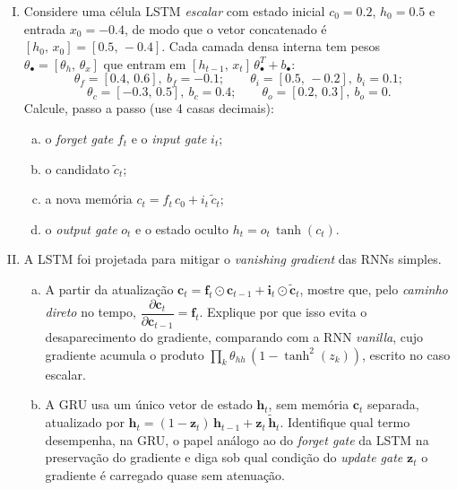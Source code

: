 \documentclass{dlproblemset}
\begin{document}
\begin{enumerate}[I)]

\item Considere uma célula LSTM \emph{escalar} com estado inicial $c_0 = 0.2$,
$h_0 = 0.5$ e entrada $x_0 = -0.4$, de modo que o vetor concatenado é
$[h_0,\, x_0] = [0.5,\, -0.4]$. Cada camada densa interna tem pesos
$\theta_\bullet = [\theta_h,\, \theta_x]$ que entram em $[h_{t-1},\, x_t]\,\theta_\bullet^{T} + b_\bullet$:
\[
    \theta_f = [0.4,\, 0.6],\ b_f = -0.1; \qquad
    \theta_i = [0.5,\, -0.2],\ b_i = 0.1;
\]
\[
    \theta_c = [-0.3,\, 0.5],\ b_c = 0.4; \qquad
    \theta_o = [0.2,\, 0.3],\ b_o = 0.
\]
Calcule, passo a passo (use 4 casas decimais):
\begin{enumerate}[(a)]
    \item o \textit{forget gate} $f_t$ e o \textit{input gate} $i_t$;
    \item o candidato $\tilde{c}_t$;
    \item a nova memória $c_t = f_t\, c_0 + i_t\, \tilde{c}_t$;
    \item o \textit{output gate} $o_t$ e o estado oculto $h_t = o_t\, \tanh(c_t)$.
\end{enumerate}

\item A LSTM foi projetada para mitigar o \textit{vanishing gradient} das RNNs simples.
\begin{enumerate}[(a)]
    \item A partir da atualização $\mathbf{c}_t = \mathbf{f}_t \odot \mathbf{c}_{t-1} + \mathbf{i}_t \odot \tilde{\mathbf{c}}_t$, mostre que,
    pelo \emph{caminho direto} no tempo, $\dfrac{\partial \mathbf{c}_t}{\partial \mathbf{c}_{t-1}} = \mathbf{f}_t$.
    Explique por que isso evita o desaparecimento do gradiente, comparando com a RNN
    \textit{vanilla}, cujo gradiente acumula o produto
    $\prod_k \theta_{hh}\,(1 - \tanh^2(z_k))$, escrito no caso escalar.
    \item {} A GRU usa um único vetor de estado $\mathbf{h}_t$, sem memória $\mathbf{c}_t$ separada,
    atualizado por $\mathbf{h}_t = (1 - \mathbf{z}_t)\, \mathbf{h}_{t-1} + \mathbf{z}_t\, \tilde{\mathbf{h}}_t$. Identifique qual
    termo desempenha, na GRU, o papel análogo ao do \textit{forget gate} da LSTM na preservação
    do gradiente e diga sob qual condição do \textit{update gate} $\mathbf{z}_t$ o gradiente é carregado
    quase sem atenuação.
\end{enumerate}


\end{enumerate}
\end{document}
